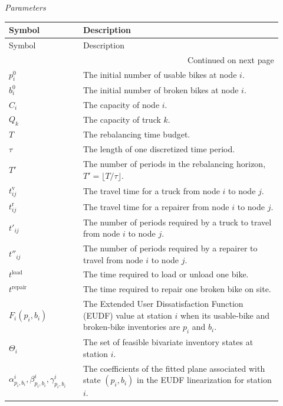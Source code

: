 {\medskip
\noindent\textit{Parameters}
\smallskip
\begin{longtable}{@{}p{0.25\linewidth}p{0.67\linewidth}@{}}
\toprule
Symbol & Description \\
\midrule
\endfirsthead
\toprule
Symbol & Description \\
\midrule
\endhead
\midrule
\multicolumn{2}{r}{Continued on next page}\\
\endfoot
\bottomrule
\endlastfoot
$p_i^0$ & The initial number of usable bikes at node $i$. \\
$b_i^0$ & The initial number of broken bikes at node $i$. \\
$C_i$ & The capacity of node $i$. \\
$Q_k$ & The capacity of truck $k$. \\
$T$ & The rebalancing time budget. \\
$\tau$ & The length of one discretized time period. \\
$T'$ & The number of periods in the rebalancing horizon, $T'=\lfloor T/\tau\rfloor$. \\
$t_{ij}^{\mathrm{v}}$ & The travel time for a truck from node $i$ to node $j$. \\
$t_{ij}^{\mathrm{r}}$ & The travel time for a repairer from node $i$ to node $j$. \\
$t'_{ij}$ & The number of periods required by a truck to travel from node $i$ to node $j$. \\
$t''_{ij}$ & The number of periods required by a repairer to travel from node $i$ to node $j$. \\
$t^{\mathrm{load}}$ & The time required to load or unload one bike. \\
$t^{\mathrm{repair}}$ & The time required to repair one broken bike on site. \\
$F_i(p_i,b_i)$ & The Extended User Dissatisfaction Function (EUDF) value at station $i$ when its usable-bike and broken-bike inventories are $p_i$ and $b_i$. \\
$\Theta_i$ & The set of feasible bivariate inventory states at station $i$. \\
$\alpha^i_{p_i,b_i},\beta^i_{p_i,b_i},\gamma^i_{p_i,b_i}$ & The coefficients of the fitted plane associated with state $(p_i,b_i)$ in the EUDF linearization for station $i$. \\
\end{longtable}

}
